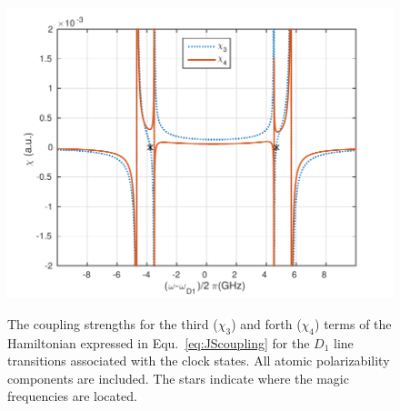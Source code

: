 \begin{figure}
\begin{minipage}{.91\linewidth}
\centering
{\includegraphics[scale=0.75]{../media/Figs/chi34_total}}
\end{minipage}
\caption{The coupling strengths for the third ($ \chi_3 $) and forth ($ \chi_4 $) terms of the Hamiltonian 
expressed in Equ.~\eqref{eq:JScoupling} for the $ D_1 $ line transitions associated with the clock states. 
All atomic polarizability components are included. The stars indicate where the magic frequencies are 
located.} 
\label{fig:chi34_total}
\end{figure}
